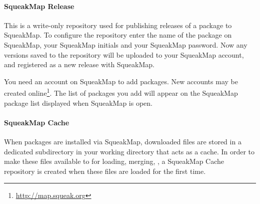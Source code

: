 \documentclass[a4paper,10pt,twoside]{book}
\begin{document}
\paragraph{SqueakMap Release} This is a write-only repository used for publishing releases of a package to SqueakMap. To configure the repository enter the name of the package on SqueakMap, your SqueakMap initials and your SqueakMap password. Now any versions saved to the repository will be uploaded to your SqueakMap account, and registered as a new release with SqueakMap.  

You need an account on SqueakMap to add packages. New accounts may be created online\footnote{\url{http://map.squeak.org}}. The list of packages you add will appear on the SqueakMap package list displayed when SqueakMap is open.


\paragraph{SqueakMap Cache} When packages are installed via SqueakMap, downloaded files are stored in a dedicated subdirectory in your working directory that acts as a cache. In order to make these files available to \MC for loading, merging, \etc, a SqueakMap Cache repository is created when these files are loaded for the first time.




\end{document}

